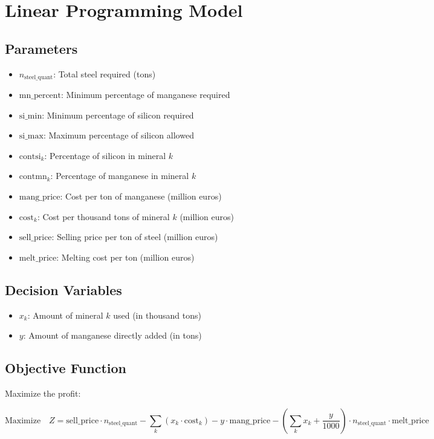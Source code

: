 \documentclass{article}
\begin{document}
\section*{Linear Programming Model}

\subsection*{Parameters}
\begin{itemize}
    \item \( n_{\text{steel\_quant}} \): Total steel required (tons)
    \item \( \text{mn\_percent} \): Minimum percentage of manganese required
    \item \( \text{si\_min} \): Minimum percentage of silicon required
    \item \( \text{si\_max} \): Maximum percentage of silicon allowed
    \item \( \text{contsi}_{k} \): Percentage of silicon in mineral \( k \)
    \item \( \text{contmn}_{k} \): Percentage of manganese in mineral \( k \)
    \item \( \text{mang\_price} \): Cost per ton of manganese (million euros)
    \item \( \text{cost}_{k} \): Cost per thousand tons of mineral \( k \) (million euros)
    \item \( \text{sell\_price} \): Selling price per ton of steel (million euros)
    \item \( \text{melt\_price} \): Melting cost per ton (million euros)
\end{itemize}

\subsection*{Decision Variables}
\begin{itemize}
    \item \( x_k \): Amount of mineral \( k \) used (in thousand tons)
    \item \( y \): Amount of manganese directly added (in tons)
\end{itemize}

\subsection*{Objective Function}
Maximize the profit:

\[
\text{Maximize} \quad Z = \text{sell\_price} \cdot n_{\text{steel\_quant}} - \sum_{k} \left( x_k \cdot \text{cost}_k \right) - y \cdot \text{mang\_price} - \left( \sum_{k} x_k + \frac{y}{1000} \right) \cdot n_{\text{steel\_quant}} \cdot \text{melt\_price}
\]
\end{document}
